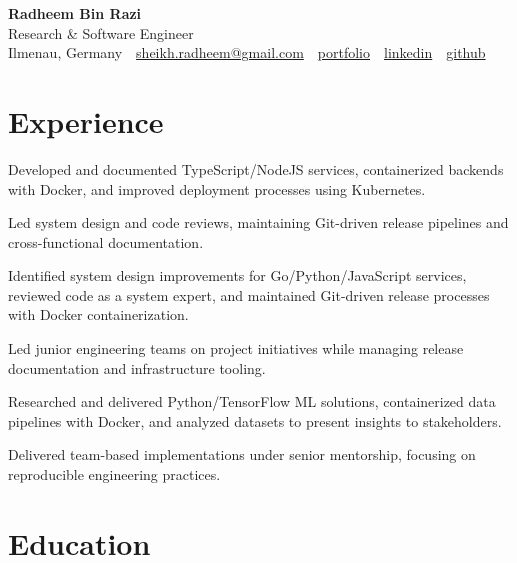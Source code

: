 \documentclass[11pt,a4paper]{resume}
\makeatletter
\newcommand{\Portfolio}{https://radheem.github.io/my-cv}
\newcommand{\PortfolioText}{portfolio}
\newcommand{\GitHub}{https://github.com/radheem}
\newcommand{\LinkedIn}{https://www.linkedin.com/in/radheem-razi}
\newcommand{\Email}{sheikh.radheem@gmail.com}
\makeatother
\begin{document}
\begin{center}
  {\huge\bfseries Radheem Bin Razi}\\[3pt]
  {\large Research \& Software Engineer}\\[6pt]
  \small
  Ilmenau, Germany \,\textbar\,
  \href{mailto:\Email}{\Email} \,\textbar\,
  \href{\Portfolio}{\PortfolioText} \,\textbar\,
  \href{\LinkedIn}{linkedin} \,\textbar\,
  \href{\GitHub}{github}
\end{center}
\vspace{2pt}

\section{Experience}

\bullets
  \item Developed and documented TypeScript/NodeJS services, containerized backends with Docker, and improved deployment processes using Kubernetes.
  \item Led system design and code reviews, maintaining Git-driven release pipelines and cross-functional documentation.
\bulletsend
\vspace{3pt}
\bullets
  \item Identified system design improvements for Go/Python/JavaScript services, reviewed code as a system expert, and maintained Git-driven release processes with Docker containerization.
  \item Led junior engineering teams on project initiatives while managing release documentation and infrastructure tooling.
\bulletsend
\vspace{3pt}
\bullets
  \item Researched and delivered Python/TensorFlow ML solutions, containerized data pipelines with Docker, and analyzed datasets to present insights to stakeholders.
  \item Delivered team-based implementations under senior mentorship, focusing on reproducible engineering practices.
\bulletsend
\vspace{3pt}

\section{Education}
\end{document}
